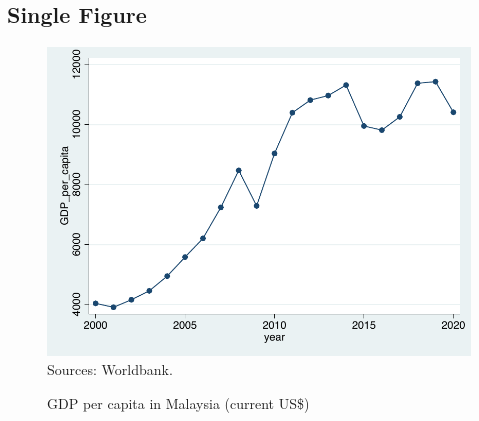 \documentclass[utf8,12pt]{article} %
\begin{document}
\subsection{Single Figure}
%
%
\begin{figure}[htbp]
	\centering %
	\includegraphics[scale=0.8]{Fig/GDP_per_capita.pdf}\\ %
	\hspace{-19em}\footnotesize{Sources: Worldbank.}\\ %
	\caption{GDP per capita in Malaysia (current US\$)} %
	\label{GDP_per_capita} %
\end{figure}
%
%
\end{document}
